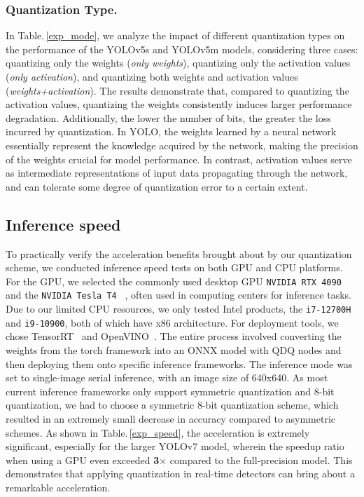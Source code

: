 \documentclass[runningheads]{llncs}
\begin{document}
\subsubsection{Quantization Type.}
In Table.\,\ref{exp_mode}, we analyze the impact of different quantization types on the performance of the YOLOv5s and YOLOv5m models, considering three cases: quantizing only the weights (\textit{only weights}), quantizing only the activation values (\textit{only activation}), and quantizing both weights and activation values (\textit{weights+activation}). The results demonstrate that, compared to quantizing the activation values, quantizing the weights consistently induces larger performance degradation. Additionally, the lower the number of bits, the greater the loss incurred by quantization. In YOLO, the weights learned by a neural network essentially represent the knowledge acquired by the network, making the precision of the weights crucial for model performance. In contrast, activation values serve as intermediate representations of input data propagating through the network, and can tolerate some degree of quantization error to a certain extent.

\subsection{Inference speed}
To practically verify the acceleration benefits brought about by our quantization scheme, we conducted inference speed tests on both GPU and CPU platforms. For the GPU, we selected the commonly used desktop GPU {\tt NVIDIA RTX 4090}~\cite{nvidia} and the {\tt NVIDIA Tesla T4}~\cite{nvidia} , often used in computing centers for inference tasks. Due to our limited CPU resources, we only tested Intel products, the {\tt i7-12700H} and {\tt i9-10900}, both of which have x86 architecture. For deployment tools, we chose TensorRT~\cite{tensorrt} and OpenVINO~\cite{openvino}. The entire process involved converting the weights from the torch framework into an ONNX model with QDQ nodes and then deploying them onto specific inference frameworks. The inference mode was set to single-image serial inference, with an image size of 640x640. As most current inference frameworks only support symmetric quantization and 8-bit quantization, we had to choose a symmetric 8-bit quantization scheme, which resulted in an extremely small decrease in accuracy compared to asymmetric schemes. As shown in Table.\,\ref{exp_speed}, the acceleration is extremely significant, especially for the larger YOLOv7 model, wherein the speedup ratio when using a GPU even exceeded \textbf{3$\times$} compared to the full-precision model. This demonstrates that applying quantization in real-time detectors can bring about a remarkable acceleration.
\end{document}
